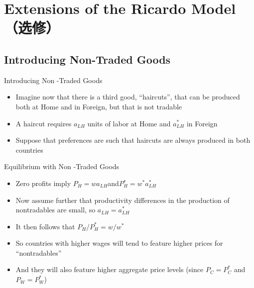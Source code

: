 \documentclass[10pt,hyperref={CJKbookmarks=true},xcolor=dvipsnames,aspectratio=169]{beamer}
\begin{document}
\section{Extensions of the Ricardo Model（选修）}


\subsection{Introducing Non-Traded Goods}
\begin{frame}{Introducing Non -Traded Goods }

\begin{itemize}
\item Imagine now that there is a third good, “haircuts”, that can be produced
both at Home and in Foreign, but that is not tradable 
\item A haircut requires $a_{LH}$ units of labor at Home and $a{}_{LH}^{*}$
in Foreign 
\item Suppose that preferences are such that haircuts are always produced
in both countries 
\end{itemize}
\end{frame}

\begin{frame}{Equilibrium with Non -Traded Goods}

\begin{itemize}
\item Zero profits imply $P_{H}=wa_{LH}$and$P{}_{H}^{*}=w^{*}a_{LH}^{*}$
\item Now assume further that productivity differences in the production
of nontradables are small, so $a$$_{LH}=a_{LH}^{*}$
\item It then follows that $P_{H}/P_{H}^{*}=w/w^{*}$
\item So countries with higher wages will tend to feature higher prices
for “nontradables” 
\item And they will also feature higher aggregate price levels (since $P_{C}=P_{C}^{*}$
and $P_{W}=P_{W}^{*}$)
\end{itemize}
\end{frame}
\end{document}
